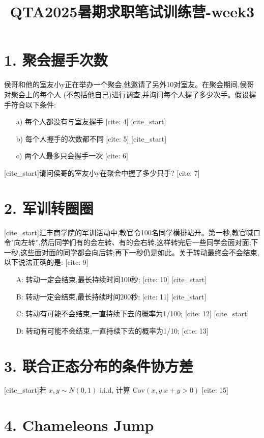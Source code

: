 \documentclass{article}
\title{QTA2025暑期求职笔试训练营-week3}
\author{}
\date{}
\begin{document}
\maketitle

\section*{1. 聚会握手次数}

侯哥和他的室友小y正在举办一个聚会,他邀请了另外10对室友。在聚会期间,侯哥对聚会上的每个人 (不包括他自己)进行调查,并询问每个人握了多少次手。假设握手符合以下条件:
\begin{itemize}
    [cite_start]\item[a)] 每个人都没有与室友握手 [cite: 4]
    [cite_start]\item[b)] 每个人握手的次数都不同 [cite: 5]
    [cite_start]\item[c)] 两个人最多只会握手一次 [cite: 6]
\end{itemize}
[cite_start]请问侯哥的室友小y在聚会中握了多少只手? [cite: 7]

\section*{2. 军训转圈圈}

[cite_start]汇丰商学院的军训活动中,教官令100名同学横排站开。第一秒,教官喊口令"向左转”,然后同学们有的会左转、有的会右转,这样转完后一些同学会面对面;下一秒,这些面对面的同学都会向后转;再下一秒仍是如此。关于转动最终会不会结束,以下说法正确的是: [cite: 9]
\begin{itemize}
    [cite_start]\item[A:] 转动一定会结束,最长持续时间100秒; [cite: 10]
    [cite_start]\item[B:] 转动一定会结束,最长持续时间200秒; [cite: 11]
    [cite_start]\item[C:] 转动有可能不会结束,一直持续下去的概率为1/100; [cite: 12]
    [cite_start]\item[D:] 转动有可能不会结束,一直持续下去的概率为1/10; [cite: 13]
\end{itemize}

\section*{3. 联合正态分布的条件协方差}

[cite_start]若 $x, y \sim N(0,1)$ i.i.d, 计算 $\text{Cov}(x, y | x+y > 0)$ [cite: 15]

\section*{4. Chameleons Jump}
\end{document}
